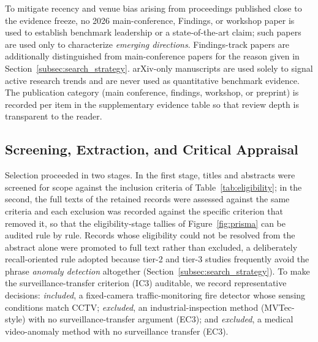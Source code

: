 \documentclass[10pt,a4paper]{article}
\begin{document}
To mitigate recency and venue bias arising from proceedings published close to the evidence freeze, no 2026 main-conference, Findings, or workshop paper is used to establish benchmark leadership or a state-of-the-art claim; such papers are used only to characterize \emph{emerging directions}. Findings-track papers are additionally distinguished from main-conference papers for the reason given in Section~\ref{subsec:search_strategy}. arXiv-only manuscripts are used solely to signal active research trends and are never used as quantitative benchmark evidence. The publication category (main conference, findings, workshop, or preprint) is recorded per item in the supplementary evidence table so that review depth is transparent to the reader.

\subsection{Screening, Extraction, and Critical Appraisal}
\label{subsec:study_selection}
Selection proceeded in two stages. In the first stage, titles and abstracts were screened for scope against the inclusion criteria of Table~\ref{tab:eligibility}; in the second, the full texts of the retained records were assessed against the same criteria and each exclusion was recorded against the specific criterion that removed it, so that the eligibility-stage tallies of Figure~\ref{fig:prisma} can be audited rule by rule. Records whose eligibility could not be resolved from the abstract alone were promoted to full text rather than excluded, a deliberately recall-oriented rule adopted because tier-2 and tier-3 studies frequently avoid the phrase \emph{anomaly detection} altogether (Section~\ref{subsec:search_strategy}). To make the surveillance-transfer criterion (IC3) auditable, we record representative decisions: \emph{included}, a fixed-camera traffic-monitoring fire detector whose sensing conditions match CCTV; \emph{excluded}, an industrial-inspection method (MVTec-style) with no surveillance-transfer argument (EC3); and \emph{excluded}, a medical video-anomaly method with no surveillance transfer (EC3).
\end{document}
